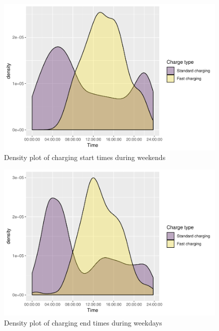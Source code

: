 \documentclass[]{article}
\begin{document}
\begin{figure}
\centering
\includegraphics{EVBB_SummaryReport_files/figure-latex/chargeBeginsWeekend-1.pdf}
\caption{\label{fig:chargeBeginsWeekend}Density plot of charging start times
during weekends}
\end{figure}

\begin{figure}
\centering
\includegraphics{EVBB_SummaryReport_files/figure-latex/chargeEndsWeekday-1.pdf}
\caption{\label{fig:chargeEndsWeekday}Density plot of charging end times
during weekdays}
\end{figure}
\end{document}
